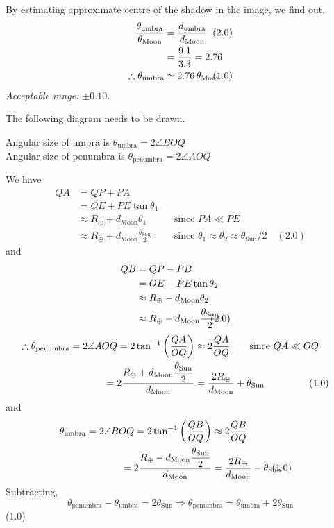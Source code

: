 \begin{description}
By estimating approximate centre of the shadow in the image, we find out,
\begin{align*}
\frac{\theta_{\mathrm{umbra}}}{\theta_{\mathrm{Moon}}}
 &= \frac{d_{\mathrm{umbra}}}{d_{\mathrm{Moon}}} & &\hspace{-2em}(2.0)\\
 &= \frac{9.1}{3.3} = 2.76\\
\therefore \theta_{\mathrm{umbra}} &\simeq 2.76\,\theta_{\mathrm{Moon}}
 & &\hspace{-2em}(1.0)
\end{align*}
\emph{Acceptable range: $\pm0.10$.}

\item[(D2.5)]
The following diagram needs to be drawn.

Angular size of umbra is $\theta_{\mathrm{umbra}} = 2\angle BOQ$\\
Angular size of penumbra is $\theta_{\mathrm{penumbra}} = 2\angle AOQ$

We have
\begin{align*}
QA &= QP + PA\\
 &= OE + PE\tan\theta_1\\
 &\approx R_\oplus + d_{\mathrm{Moon}}\theta_1 & &\text{since } PA \ll PE\\
 &\approx R_\oplus + d_{\mathrm{Moon}}\frac{\theta_{\mathrm{Sun}}}{2}
   & &\text{since } \theta_1 \approx \theta_2 \approx \theta_{\mathrm{Sun}}/2
   \quad(2.0)
\end{align*}
and
\begin{align*}
QB &= QP - PB\\
 &= OE - PE\tan\theta_2\\
 &\approx R_\oplus - d_{\mathrm{Moon}}\theta_2\\
 &\approx R_\oplus - d_{\mathrm{Moon}}\frac{\theta_{\mathrm{Sun}}}{2}
   & &\hspace{-2em}(2.0)
\end{align*}
\begin{align*}
\therefore \theta_{\mathrm{penumbra}} = 2\angle AOQ
 = 2\tan^{-1}\left(\frac{QA}{OQ}\right) &\approx 2\frac{QA}{OQ}
   \qquad\text{since } QA \ll OQ\\
 = 2\frac{R_\oplus + d_{\mathrm{Moon}}\dfrac{\theta_{\mathrm{Sun}}}{2}}{d_{\mathrm{Moon}}}
 &= \frac{2R_\oplus}{d_{\mathrm{Moon}}} + \theta_{\mathrm{Sun}}
   & &\hspace{-2em}(1.0)
\end{align*}
and
\begin{align*}
\theta_{\mathrm{umbra}} = 2\angle BOQ
 = 2\tan^{-1}\left(\frac{QB}{OQ}\right) &\approx 2\frac{QB}{OQ}\\
 = 2\frac{R_\oplus - d_{\mathrm{Moon}}\dfrac{\theta_{\mathrm{Sun}}}{2}}{d_{\mathrm{Moon}}}
 &= \frac{2R_\oplus}{d_{\mathrm{Moon}}} - \theta_{\mathrm{Sun}}
   & &\hspace{-2em}(1.0)
\end{align*}
Subtracting,
\[
\theta_{\mathrm{penumbra}} - \theta_{\mathrm{umbra}} = 2\theta_{\mathrm{Sun}}
\Rightarrow \theta_{\mathrm{penumbra}} = \theta_{\mathrm{umbra}} + 2\theta_{\mathrm{Sun}}
\]
\hfill(1.0)


\end{description}
